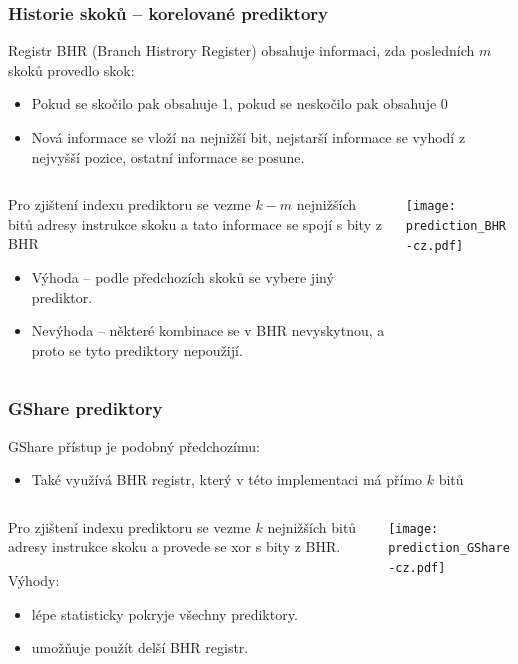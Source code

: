 \documentclass{beamer}
\begin{document}
\begin{frame}
\frametitle{Historie skoků -- korelované prediktory}

Registr BHR (Branch Histrory Register) obsahuje informaci, zda posledních $m$ skoků provedlo skok:
\begin{itemize}
\item Pokud se skočilo pak obsahuje 1, pokud se neskočilo pak obsahuje 0
\item Nová informace se vloží na nejnižší bit, nejstarší informace se vyhodí z nejvyšší pozice, ostatní informace se posune.
\end{itemize}

\begin{columns}[T]
\begin{column}{0.5\textwidth}
\small
Pro zjištení indexu prediktoru se vezme $k-m$ nejnižších bitů adresy instrukce skoku a tato informace se spojí s bity z BHR
\begin{itemize}
\item Výhoda -- podle předchozích skoků se vybere jiný prediktor.
\item Nevýhoda -- některé kombinace se v BHR nevyskytnou, a proto se tyto prediktory nepoužijí.
\end{itemize}
\end{column}
\begin{column}{0.5\textwidth}
\texttt{[image: prediction\_BHR-cz.pdf]}
\end{column}
\end{columns}

\end{frame}

\begin{frame}
\frametitle{GShare prediktory}

GShare přístup je podobný předchozímu:
\begin{itemize}
\item Také využívá BHR registr, který v této implementaci má přímo $k$ bitů
\end{itemize}

\begin{columns}[T]
\begin{column}{0.5\textwidth}
\small
Pro zjištení indexu prediktoru se vezme $k$ nejnižších bitů adresy instrukce skoku a provede se xor s bity z BHR.

Výhody:
\begin{itemize}
\item lépe statisticky pokryje všechny prediktory.
\item umožňuje použít delší BHR registr.
\end{itemize}
\end{column}
\begin{column}{0.5\textwidth}
\texttt{[image: prediction\_GShare-cz.pdf]}
\end{column}
\end{columns}
\end{frame}
\end{document}
